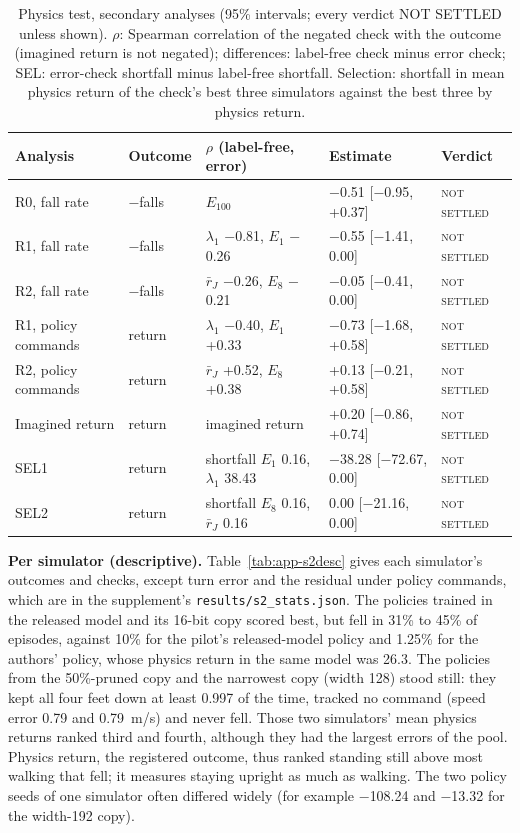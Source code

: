 \begin{table}[h]
\centering
\caption{Physics test, secondary analyses (95\% intervals; every verdict NOT SETTLED unless shown). $\rho$: Spearman
correlation of the negated check with the outcome (imagined return is not negated); differences: label-free check minus error check; SEL: error-check shortfall minus label-free shortfall. Selection:
shortfall in mean physics return of the check's best three simulators against the best three by physics return.}
\label{tab:app-s2sec}
\footnotesize
\begin{tabular}{@{}lllll@{}}
\toprule
Analysis & Outcome & $\rho$ (label-free, error) & Estimate & Verdict \\
\midrule
R0, fall rate & $-$falls & $E_{100}$ & $-$0.51 [$-$0.95, +0.37] & \textsc{not settled} \\
R1, fall rate & $-$falls & $\lambda_1$ $-$0.81, $E_1$ $-$0.26 & $-$0.55 [$-$1.41, 0.00] & \textsc{not settled} \\
R2, fall rate & $-$falls & $\bar r_J$ $-$0.26, $E_8$ $-$0.21 & $-$0.05 [$-$0.41, 0.00] & \textsc{not settled} \\
R1, policy commands & return & $\lambda_1$ $-$0.40, $E_1$ +0.33 & $-$0.73 [$-$1.68, +0.58] & \textsc{not settled} \\
R2, policy commands & return & $\bar r_J$ +0.52, $E_8$ +0.38 & +0.13 [$-$0.21, +0.58] & \textsc{not settled} \\
Imagined return & return & imagined return & +0.20 [$-$0.86, +0.74] & \textsc{not settled} \\
SEL1 & return & shortfall $E_1$ 0.16, $\lambda_1$ 38.43 & $-$38.28 [$-$72.67, 0.00] & \textsc{not settled} \\
SEL2 & return & shortfall $E_8$ 0.16, $\bar r_J$ 0.16 & 0.00 [$-$21.16, 0.00] & \textsc{not settled} \\
\bottomrule
\end{tabular}
\end{table}

\textbf{Per simulator (descriptive).} Table~\ref{tab:app-s2desc} gives each simulator's outcomes and checks, except turn error and the residual under policy commands, which are in the supplement's \texttt{results/s2\_stats.json}. The
policies trained in the released model and its 16-bit copy scored best, but fell in 31\% to
45\% of episodes, against 10\% for the pilot's released-model policy and
1.25\% for the authors' policy, whose physics return in the same model was 26.3. The
policies from the 50\%-pruned copy and the narrowest copy (width 128) stood still: they kept all four feet down at
least 0.997 of the time, tracked no command (speed error 0.79 and 0.79~m/s)
and never fell. Those two simulators' mean physics returns ranked third and fourth, although they had the largest errors of the pool. Physics return, the registered outcome, thus ranked standing still above
most walking that fell; it measures staying upright as much as walking. The two policy seeds of one simulator often
differed widely (for example $-$108.24 and $-$13.32 for the width-192 copy).

